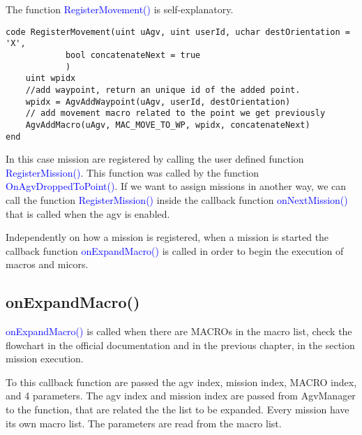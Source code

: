 The function \textcolor{blue}{RegisterMovement()} is self-explanatory.

\begin{lstlisting}[caption=RegisterMovement() function,label=lstRegisterMovment]
code RegisterMovement(uint uAgv, uint userId, uchar destOrientation = 'X',
			bool concatenateNext = true
			)
	uint wpidx
	//add waypoint, return an unique id of the added point.
	wpidx = AgvAddWaypoint(uAgv, userId, destOrientation)
	// add movement macro related to the point we get previously
	AgvAddMacro(uAgv, MAC_MOVE_TO_WP, wpidx, concatenateNext)
end
\end{lstlisting}

In this case mission are registered by calling the user defined function \textcolor{blue}{RegisterMission()}. This function was called by the function \textcolor{blue}{OnAgvDroppedToPoint()}. If we want to assign missions in another way, we can call the function \textcolor{blue}{RegisterMission()} inside the callback function \textcolor{blue}{onNextMission()} that is called when the agv is enabled.

Independently on how a mission is registered, when a mission is started the callback function \textcolor{blue}{onExpandMacro()} is called in order to begin the execution of macros and micors.


\subsection*{onExpandMacro()}

\textcolor{blue}{onExpandMacro()} is called when there are MACROs in the macro list, check the flowchart in the official documentation and in the previous chapter, in the section mission execution.

To this callback function are passed the agv index, mission index, MACRO index, and 4 parameters. The agv index and mission index are passed from AgvManager to the function, that are related the the list to be expanded. Every mission have its own macro list. The parameters are read from the macro list.

